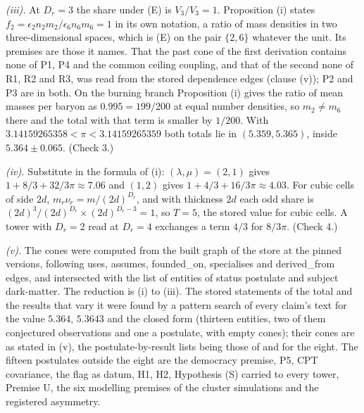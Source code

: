 \emph{(iii).} At $D_{r} = 3$ the share under (E) is $V_{3}/V_{3} = 1$. Proposition (i) states $f_{2} = \epsilon_{2}n_{2}m_{2}/\epsilon_{6}n_{6}m_{6} = 1$ in its own notation, a ratio of mass densities in two three-dimensional spaces, which is (E) on the pair $\{2, 6\}$ whatever the unit. Its premises are those it names. That the past cone of the first derivation contains none of P1, P4 and the common ceiling coupling, and that of the second none of R1, R2 and R3, was read from the stored dependence edges (clause (v)); P2 and P3 are in both. On the burning branch Proposition (i) gives the ratio of mean masses per baryon as $0.995 = 199/200$ at equal number densities, so $m_{2} \neq m_{6}$ there and the total with that term is smaller by $1/200$. With $3.14159265358 < \pi < 3.14159265359$ both totals lie in $(5.359, 5.365)$, inside $5.364 \pm 0.065$. (Check 3.)

\emph{(iv).} Substitute in the formula of (i): $(\lambda, \mu) = (2, 1)$ gives $1 + 8/3 + 32/3\pi \approx 7.06$ and $(1, 2)$ gives $1 + 4/3 + 16/3\pi \approx 4.03$. For cubic cells of side $2d$, $m_{r}\nu_{r} = m/(2d)^{D_{r}}$, and with thickness $2d$ each odd share is $(2d)^{3}/(2d)^{D_{r}} \times (2d)^{D_{r}-3} = 1$, so $T = 5$, the stored value for cubic cells. A tower with $D_{r} = 2$ read at $D_{r} = 4$ exchanges a term $4/3$ for $8/3\pi$. (Check 4.)

\emph{(v).} The cones were computed from the built graph of the store at the pinned versions, following uses, assumes, founded\_on, specialises and derived\_from edges, and intersected with the list of entities of status postulate and subject dark-matter. The reduction is (i) to (iii). The stored statements of the total and the results that vary it were found by a pattern search of every claim's text for the value $5.364$, $5.3643$ and the closed form (thirteen entities, two of them conjectured observations and one a postulate, with empty cones); their cones are as stated in (v), the postulate-by-result lists being those of  and  for the eight. The fifteen postulates outside the eight are the democracy premise, P5, CPT covariance, the flag as datum, H1, H2, Hypothesis (S) carried to every tower, Premise U, the six modelling premises of the cluster simulations and the registered asymmetry.
